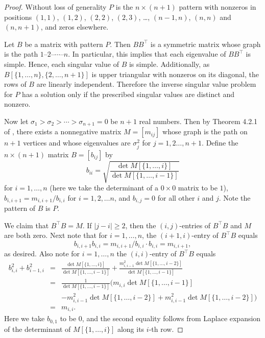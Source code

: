 \documentclass[preprint,12pt]{elsarticle}
\newcommand{\trans  }{^\top}
\begin{document}
\begin{proof}
Without loss of generality $P$ is the $n\times (n+1)$ pattern with  nonzeros in positions 
$(1,1)$, $(1,2)$, $(2,2)$, $(2,3)$, \ldots, $(n-1,n)$, $(n,n)$ and $(n,n+1)$, and zeros elsewhere.

Let $B$ be a matrix with pattern $P$.  Then $BB\trans $ is 
a symmetric matrix whose graph is the path $1$--$2$--$\cdots$--$n$.
In particular, this implies that each eigenvalue of $B{B\trans }$ is simple.
Hence, each singular value of $B$ is simple. Additionally, as $B[\{1, \ldots, n\}, \{2, \ldots, n+1\}]$ is upper triangular with nonzeros on its diagonal,  the rows of $B$ are linearly independent.
Therefore the inverse singular value problem for $P$  has a solution only if the prescribed singular values 
are distinct and nonzero. 


Now let $\sigma_1> \sigma_2>\cdots >\sigma_{n+1}=0$ be $n+1$ real numbers.
Then by Theorem 4.2.1 of \cite{Gladwell}, there exists a nonnegative matrix 
$M=[m_{ij}]$ whose graph is the path on $n+1$ vertices and whose eigenvalues are $\sigma_j^2$ for $j=1,2\ldots, n+1$.
Define the $n\times (n+1)$ matrix $B=[b_{ij}]$ 
by 
\[
b_{ii}= \sqrt{\frac{\det M[\{1,\ldots, i\}]}{\det M[\{1, \ldots, i-1\} ]}}
\]
for $i=1,\ldots, n$ (here we take the determinant of a $0\times 0$ matrix to be $1$), 
$b_{i,i+1}=m_{i,i+1}/b_{i,i}$ for $i=1,2,\ldots n$, and $b_{i,j}=0$ for all other $i$ and $j$. Note the pattern of $B$ is $P$.

We claim that $B\trans B =M$. 
If $|j-i| \geq 2$, then the $(i,j)$-entries of $B\trans B$ and $M$
are both zero. 
Next note that for $i=1,\ldots, n$, the  $(i+1,i)$-entry of $B\trans B $ equals
\[ 
b_{i,i+1}b_{i,i}= m_{i,i+1}/b_{i,i}\cdot b_{i,i}=m_{i,i+1},
\] 
as desired. 
Also note for $i=1,\ldots, n$ the $(i,i)$-entry of $B\trans B $ equals
\begin{eqnarray*}
 b_{i,i}^2+ b_{i-1,i}^2&=&  \frac{\det M[\{1,\ldots, i\}]}{\det M[\{1,\ldots, i-1\}]}
+ \frac{ m_{i,i-1}^2\det M[\{1,\ldots, i-2\}]}{\det M[\{1, \ldots, i-1\} ]}
\\
&=& \frac{1}{\det M[\{1, \ldots, i-1\}] } ( 
m_{i,i} \det M[\{1,\ldots,i-1\} ]
\\
 & & -m_{i,i-1}^2 \det M[\{1, \ldots,i-2 \}]
+ m_{i,i-1}^2 \det M[\{1, \ldots, i-2 \}] )\\
&=& 
 m_{i,i}.
\end{eqnarray*}
 Here we take $b_{0,1}$ to be $0$, and the second equality follows from 
 Laplace expansion of the determinant of $M[\{1, \ldots, i\}]$ along its $i$-th row. 


\end{proof}
\end{document}
